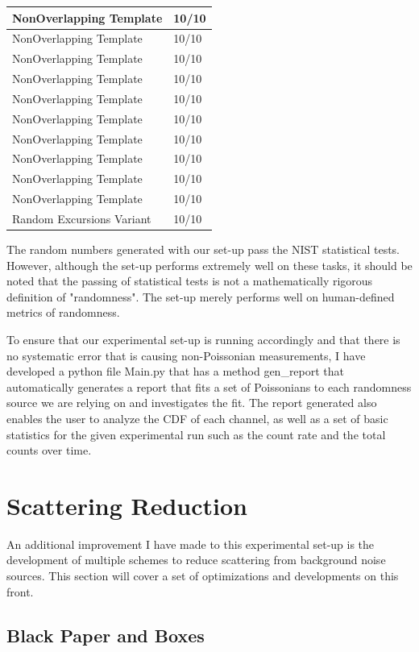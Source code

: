 \documentclass[letterpaper, 11 pt]{article}
\begin{document}
\begin{table}[H]
\begin{tabular}{|l|l|}
NonOverlapping Template   & 10/10      \\\hline
NonOverlapping Template   & 10/10      \\\hline
NonOverlapping Template   & 10/10      \\\hline
NonOverlapping Template   & 10/10      \\\hline
NonOverlapping Template   & 10/10      \\\hline
NonOverlapping Template   & 10/10      \\\hline
NonOverlapping Template   & 10/10      \\\hline
NonOverlapping Template   & 10/10      \\\hline
NonOverlapping Template   & 10/10      \\\hline
NonOverlapping Template   & 10/10      \\\hline
Random Excursions Variant & 10/10      \\\hline
\end{tabular}
\end{table}
\label{tab:rng_test}

The random numbers generated with our set-up pass the NIST statistical tests.
However, although the set-up performs extremely well on these tasks, it should
be noted that the passing of statistical tests is not a mathematically rigorous
definition of "randomness". The set-up merely performs well on human-defined
metrics of randomness.

To ensure that our experimental set-up is running accordingly and that there is
no systematic error that is causing non-Poissonian measurements, I have developed a
python file Main.py that has a method gen\_report that automatically generates a report that fits a set of
Poissonians to each randomness source we are relying on and investigates the fit.
The report generated also enables the user to analyze the CDF of each channel, as well
as a set of basic statistics for the given experimental run such as the count rate and the
total counts over time.


\section{Scattering Reduction}
An additional improvement I have made to this experimental set-up is the
development of multiple schemes to reduce scattering from background noise
sources. This section will cover a set of optimizations and developments on this
front.

\subsection{Black Paper and Boxes}
\end{document}
